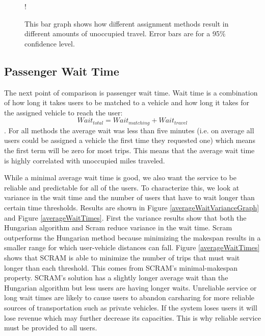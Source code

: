 \documentclass[letterpaper]{article}
\begin{document}
\begin{figure}
\resizebox {\columnwidth} {!} {
}
\caption{This bar graph shows how different assignment methods result in different amounts of unoccupied travel. Error bars are for a 95$\%$ confidence level.}
\label{unoccupiedGraph}
\end{figure}

\subsection{Passenger Wait Time}

The next point of comparison is passenger wait time. Wait time is a combination of how long it takes users to be matched to a vehicle and how long it takes for the assigned vehicle to reach the user:
$$Wait_{total} = Wait_{matching} + Wait_{travel} $$
. For all methods the average wait was less than five minutes (i.e. on average all users could be assigned a vehicle the first time they requested one) which means the first term will be zero for most trips. This means that the average wait time is highly correlated with unoccupied miles traveled. 

While a minimal average wait time is good, we also want the service to be reliable and predictable for all of the users. To characterize this, we look at variance in the wait time and the number of users that have to wait longer than certain time thresholds. Results are shown in Figure \ref{averageWaitVarianceGraph} and Figure \ref{averageWaitTimes}. First the variance results show that both the Hungarian algorithm and Scram reduce variance in the wait time. Scram outperforms the Hungarian method because minimizing the makespan results in a smaller range for which user-vehicle distances can fall. Figure \ref{averageWaitTimes} shows that SCRAM is able to minimize the number of trips that must wait longer than each threshold. This comes from SCRAM's minimal-makespan property. SCRAM's solution has a slightly longer average wait than the Hungarian algorithm but less users are having longer waits. Unreliable service or long wait times are likely to cause users to abandon carsharing for more reliable sources of transportation such as private vehicles. If the system loses users it will lose revenue which may further decrease its capacities. This is why reliable service must be provided to all users.
\end{document}
